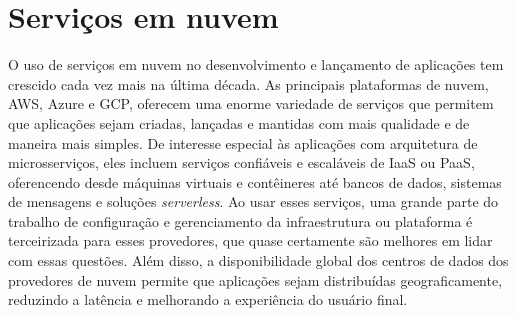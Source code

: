

\section{Serviços em nuvem}

O uso de serviços em nuvem no desenvolvimento e lançamento de aplicações tem crescido cada vez mais na última década. As principais plataformas de nuvem, AWS, Azure e GCP, oferecem uma enorme variedade de serviços que permitem que aplicações sejam criadas, lançadas e mantidas com mais qualidade e de maneira mais simples. De interesse especial às aplicações com arquitetura de microsserviços, eles incluem serviços confiáveis e escaláveis de IaaS ou PaaS, oferencendo desde máquinas virtuais e contêineres até bancos de dados, sistemas de mensagens e soluções \emph{serverless}. Ao usar esses serviços, uma grande parte do trabalho de configuração e gerenciamento da infraestrutura ou plataforma é terceirizada para esses provedores, que quase certamente são melhores em lidar com essas questões. Além disso, a disponibilidade global dos centros de dados dos provedores de nuvem permite que aplicações sejam distribuídas geograficamente, reduzindo a latência e melhorando a experiência do usuário final. \cite{livro-building-microservices}

